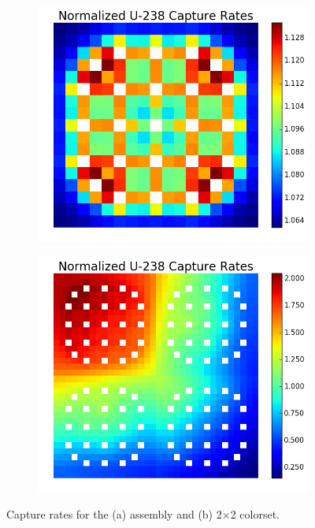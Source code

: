 \begin{figure}[h!]
\centering
\begin{subfigure}{0.35\textwidth}
  \includegraphics[width=\linewidth]{figures/capt-assm}
  \caption{}
  \label{fig:capt-assm}
\end{subfigure}
\begin{subfigure}{0.35\textwidth}
  \centering
  \includegraphics[width=\linewidth]{figures/capt-reflector}
  \caption{}
  \label{fig:capt-reflector}
\end{subfigure}
\caption{Capture rates for the (a) assembly and (b) 2$\times$2 colorset.}
\label{fig:capt-rates}
\end{figure}
